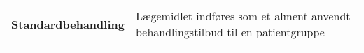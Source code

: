 \begin{table}[H]
\begin{tabular}{p{4.5cm} p{9.8cm}}
\textbf{Standardbehandling} & Lægemidlet indføres som et alment anvendt behandlingstilbud til en patientgruppe\vspace{0.5cm} \\
& \vspace{0.5cm} \\
\end{tabular}
\end{table}



